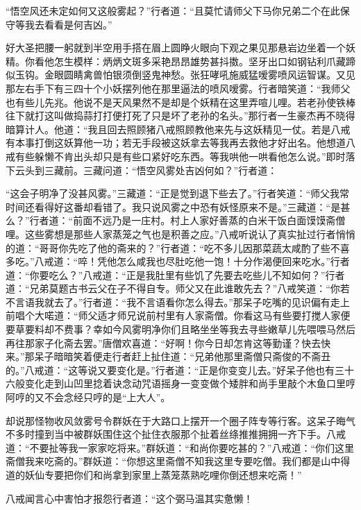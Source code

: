 \documentclass[12pt,UTF8]{ctexbook}
\begin{document}
{	“悟空风还未定如何又这般雾起？”行者道：“且莫忙请师父下马你兄弟二个在此保守等我去看看是何吉凶。”
	
	好大圣把腰一躬就到半空用手搭在眉上圆睁火眼向下观之果见那悬岩边坐着一个妖精。你看他怎生模样：炳炳文斑多采艳昂昂雄势甚抖擞。坚牙出口如钢钻利爪藏蹄似玉钩。金眼圆睛禽兽怕银须倒竖鬼神愁。张狂哮吼施威猛嗳雾喷风运智谋。又见那左右手下有三四十个小妖摆列他在那里逼法的喷风嗳雾。行者暗笑道：“我师父也有些儿先兆。他说不是天风果然不是却是个妖精在这里弄喧儿哩。若老孙使铁棒往下就打这叫做捣蒜打打便打死了只是坏了老孙的名头。”那行者一生豪杰再不晓得暗算计人。他道：“我且回去照顾猪八戒照顾教他来先与这妖精见一仗。若是八戒有本事打倒这妖算他一功；若无手段被这妖拿去等我再去救他才好出名。他想道八戒有些躲懒不肯出头却只是有些口紧好吃东西。等我哄他一哄看他怎么说。”即时落下云头到三藏前。三藏问道：“悟空风雾处吉凶何如？”行者道：
	
	“这会子明净了没甚风雾。”三藏道：“正是觉到退下些去了。”行者笑道：“师父我常时间还看得好这番却看错了。我只说风雾之中恐有妖怪原来不是。”三藏道：“是甚么？”行者道：“前面不远乃是一庄村。村上人家好善蒸的白米干饭白面馍馍斋僧哩。这些雾想是那些人家蒸笼之气也是积善之应。”八戒听说认了真实扯过行者悄悄的道：“哥哥你先吃了他的斋来的？”行者道：“吃不多儿因那菜蔬太咸酌了些不喜多吃。”八戒道：“啐！凭他怎么咸我也尽肚吃他一饱！十分作渴便回来吃水。”行者道：“你要吃么？”八戒道：“正是我肚里有些饥了先要去吃些儿不知如何？”行者道：“兄弟莫题古书云父在子不得自专。师父又在此谁敢先去？”八戒笑道：“你若不言语我就去了。”行者道：“我不言语看你怎么得去。”那呆子吃嘴的见识偏有走上前唱个大喏道：“师父适才师兄说前村里有人家斋僧。你看这马有些要打搅人家便要草要料却不费事？幸如今风雾明净你们且略坐坐等我去寻些嫩草儿先喂喂马然后再往那家子化斋去罢。”唐僧欢喜道：“好啊！你今日却怎肯这等勤谨？快去快来。”那呆子暗暗笑着便走行者赶上扯住道：“兄弟他那里斋僧只斋俊的不斋丑的。”八戒道：“这等说又要变化是。”行者道：“正是你变变儿去。”好呆子他也有三十六般变化走到山凹里捻着诀念动咒语摇身一变变做个矮胖和尚手里敲个木鱼口里哼阿哼的又不会念经只哼的是“上大人”。
	
	却说那怪物收风敛雾号令群妖在于大路口上摆开一个圈子阵专等行客。这呆子晦气不多时撞到当中被群妖围住这个扯住衣服那个扯着丝绦推推拥拥一齐下手。八戒道：“不要扯等我一家家吃将来。”群妖道：“和尚你要吃甚的？”八戒道：“你们这里斋僧我来吃斋的。”群妖道：“你想这里斋僧不知我这里专要吃僧。我们都是山中得道的妖仙专要把你们和尚拿到家里上蒸笼蒸熟吃哩你倒还想来吃斋！”
	
	八戒闻言心中害怕才报怨行者道：“这个弼马温其实惫懒！
	
}
\end{document}
